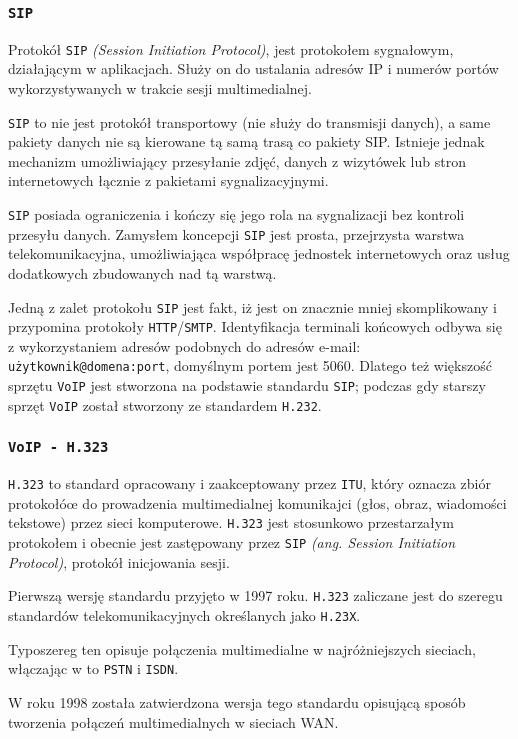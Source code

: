 \documentclass{article}
\begin{document}
\subsubsection{\tt SIP}
Protokół {\tt SIP} \emph{(Session Initiation Protocol)}, jest protokołem sygnałowym,
działającym w aplikacjach. Służy on do ustalania adresów IP i numerów portów
wykorzystywanych w trakcie sesji multimedialnej.

{\tt SIP} to nie jest protokół transportowy (nie służy do transmisji danych),
a same pakiety danych nie są kierowane tą samą trasą co pakiety SIP.
Istnieje jednak mechanizm umożliwiający przesyłanie zdjęć, danych z wizytówek
lub stron internetowych łącznie z pakietami sygnalizacyjnymi.

{\tt SIP} posiada ograniczenia i kończy się jego rola na sygnalizacji bez kontroli
przesyłu danych. Zamysłem koncepcji {\tt SIP} jest prosta, przejrzysta warstwa
telekomunikacyjna, umożliwiająca współpracę jednostek internetowych oraz usług dodatkowych
zbudowanych nad tą warstwą.

Jedną z zalet protokołu {\tt SIP} jest fakt, iż jest on znacznie mniej skomplikowany
i przypomina protokoły {\tt HTTP}/{\tt SMTP}. Identyfikacja terminali końcowych odbywa się z
wykorzystaniem adresów podobnych do adresów e-mail: {\tt użytkownik@domena:port},
domyślnym portem jest 5060.
Dlatego też większość sprzętu {\tt VoIP} jest stworzona na podstawie standardu {\tt SIP};
podczas gdy starszy sprzęt {\tt VoIP} został stworzony ze standardem {\tt H.232}.
\subsubsection{\tt VoIP - H.323}
{\tt H.323} to standard opracowany i zaakceptowany przez {\tt ITU}, który oznacza zbiór
protokołóœ do prowadzenia multimedialnej komunikajci (głos, obraz, wiadomości tekstowe)
przez sieci komputerowe. {\tt H.323} jest stosunkowo przestarzałym protokołem i obecnie
jest zastępowany przez {\tt SIP} \emph{(ang. Session Initiation Protocol)}, protokół
inicjowania sesji.

Pierwszą wersję standardu przyjęto w 1997 roku. {\tt H.323} zaliczane jest do szeregu
standardów telekomunikacyjnych określanych jako {\tt H.23X}.

Typoszereg ten opisuje połączenia multimedialne w najróżniejszych sieciach, włączając w to
{\tt PSTN} i {\tt ISDN}.

W roku 1998 została zatwierdzona wersja tego standardu opisującą sposób tworzenia połączeń
multimedialnych w sieciach WAN.
\end{document}
